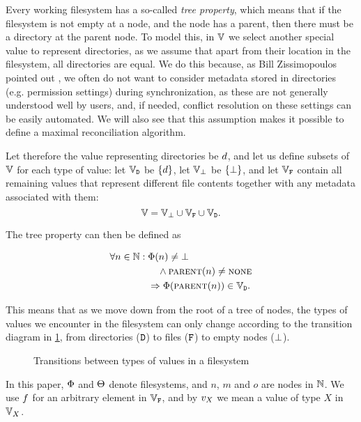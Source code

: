 Every working filesystem has a so-called \emph{tree property}, which means that
if the filesystem is not empty at a node, and the node has a parent,
then there must be a directory at the parent node.
To model this, in $\mathbb{V}$ we select another special value
to represent directories, as we assume that apart from their location
in the filesystem, all directories are equal.
We do this because, as Bill Zissimopoulos pointed 
out \cite{BZ},
we often do not want to consider metadata stored in
directories (e.g. permission settings) during synchronization,
as these are not generally understood well by users,
and, if needed, conflict resolution on these settings can be easily automated.
We will also see that this assumption makes it possible
to define a maximal reconciliation algorithm.

Let therefore the value representing directories be $d$,
and let us define subsets of $\mathbb{V}$ for each type of value:
let $\mathbb{V}_{\mathtt{D}}$ be $\{d\}$, let $\mathbb{V}_{\bot}$ be $\{\bot\}$, 
and let $\mathbb{V}_{\mathtt{F}}$ contain all remaining values that represent
different file contents together with any metadata associated with them:
\[ \mathbb{V} = \mathbb{V}_{\bot} \cup \mathbb{V}_{\mathtt{F}} \cup \mathbb{V}_{\mathtt{D}}. \]

The tree property can then be defined as
\begin{mydef}
\begin{align*}
\forall n\in\mathbb{N}:{} &\Phi(n) \neq \bot \\
&\quad\wedge \text{\normalfont\scshape{parent}}(n) \neq \text{\normalfont\scshape{none}} \\
&\Rightarrow \Phi(\text{\normalfont\scshape{parent}}(n)) \in \mathbb{V}_{\mathtt{D}}. 
\end{align*}
\end{mydef}
This means that as we move down from the root of a tree of nodes,
the types of values we encounter in the filesystem can only change according to the
transition diagram in \cref{fig_transition}, from directories ($\mathtt{D}$) to files ($\mathtt{F}$)
to empty nodes ($\bot$).

\begin{figure}[htb]

\caption{Transitions between types of values in a filesystem}\label{fig_transition}
\end{figure}

In this paper, $\Phi$ and $\Theta$ denote filesystems,
and $n$, $m$ and $o$ are nodes in $\mathbb{N}$.
We use $f$ for an arbitrary element in $\mathbb{V}_{\mathtt{F}}$, 
and by $v_X$ we mean a value of type $X$ in $\mathbb{V}_{X}$.

